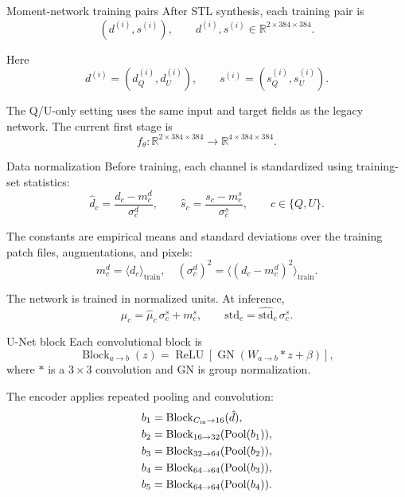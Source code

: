 \documentclass[aspectratio=169,11pt]{beamer}
\begin{document}
\begin{frame}[fragile]{Moment-network training pairs}
After STL synthesis, each training pair is
\[
  (d^{(i)},s^{(i)}),
  \qquad
  d^{(i)},s^{(i)}\in\mathbb{R}^{2\times384\times384}.
\]

\vspace{0.25em}
Here
\[
  d^{(i)}=(d_Q^{(i)},d_U^{(i)}),
  \qquad
  s^{(i)}=(s_Q^{(i)},s_U^{(i)}).
\]

\vspace{0.25em}
The Q/U-only setting uses the same input and target fields as the legacy
network.  The current first stage is
\[
  f_\theta:\mathbb{R}^{2\times384\times384}
  \longrightarrow
  \mathbb{R}^{4\times384\times384}.
\]
\end{frame}

\begin{frame}[fragile]{Data normalization}
Before training, each channel is standardized using training-set statistics:
\[
  \hat d_c=\frac{d_c-m_c^{d}}{\sigma_c^{d}},
  \qquad
  \hat s_c=\frac{s_c-m_c^{s}}{\sigma_c^{s}},
  \qquad c\in\{Q,U\}.
\]

\vspace{0.25em}
The constants are empirical means and standard deviations over the training
patch files, augmentations, and pixels:
\[
  m_c^{d}=\langle d_c\rangle_{\mathrm{train}},
  \quad
  (\sigma_c^{d})^2=\langle(d_c-m_c^{d})^2\rangle_{\mathrm{train}}.
\]

\vspace{0.25em}
The network is trained in normalized units.  At inference,
\[
  \mu_c = \hat\mu_c\,\sigma_c^{s}+m_c^{s},
  \qquad
  \mathrm{std}_c=\widehat{\mathrm{std}}_c\,\sigma_c^{s}.
\]
\end{frame}

\begin{frame}[fragile]{U-Net block}
Each convolutional block is
\[
  \operatorname{Block}_{a\to b}(z)
  =
  \operatorname{ReLU}
  \left[
    \operatorname{GN}
    \left(
      W_{a\to b}*z+\beta
    \right)
  \right],
\]
where $*$ is a $3\times3$ convolution and GN is group normalization.

\vspace{0.25em}
The encoder applies repeated pooling and convolution:
\[
\begin{aligned}
  b_1&=\operatorname{Block}_{C_{\rm in}\to16}(\hat d),\\
  b_2&=\operatorname{Block}_{16\to32}(\operatorname{Pool}(b_1)),\\
  b_3&=\operatorname{Block}_{32\to64}(\operatorname{Pool}(b_2)),\\
  b_4&=\operatorname{Block}_{64\to64}(\operatorname{Pool}(b_3)),\\
  b_5&=\operatorname{Block}_{64\to64}(\operatorname{Pool}(b_4)).
\end{aligned}
\]
\end{frame}
\end{document}
